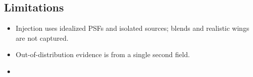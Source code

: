 \subsection{Limitations}
\begin{itemize}
  \item Injection uses idealized PSFs and isolated sources; blends and
    realistic wings are not captured.
  \item Out-of-distribution evidence is from a single second field.
  \item {}
\end{itemize}

